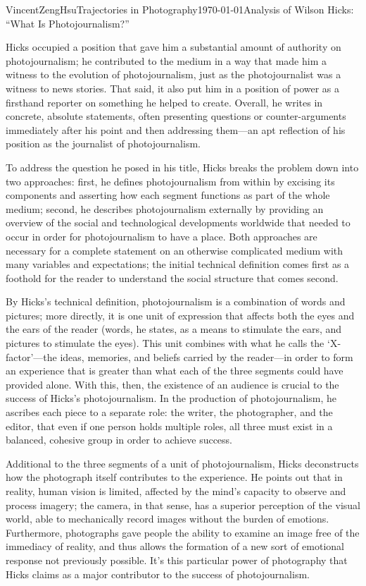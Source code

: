 \documentclass{article}[12pt]
\begin{document}
\begin{mla}{Vincent}{Zeng}{Hsu}{Trajectories in Photography}{\today}{Analysis of Wilson Hicks: ``What Is Photojournalism?''}
	
	Hicks occupied a position that gave him a substantial amount of authority on photojournalism; he contributed to the medium in a way that made him a witness to the evolution of photojournalism, just as the photojournalist was a witness to news stories. That said, it also put him in a position of power as a firsthand reporter on something he helped to create. Overall, he writes in concrete, absolute statements, often presenting questions or counter-arguments immediately after his point and then addressing them---an apt reflection of his position as the journalist of photojournalism.
	
	To address the question he posed in his title, Hicks breaks the problem down into two approaches: first, he defines photojournalism from within by excising its components and asserting how each segment functions as part of the whole medium; second, he describes photojournalism externally by providing an overview of the social and technological developments worldwide that needed to occur in order for photojournalism to have a place. Both approaches are necessary for a complete statement on an otherwise complicated medium with many variables and expectations; the initial technical definition comes first as a foothold for the reader to understand the social structure that comes second.
	
	By Hicks's technical definition, photojournalism is a combination of words and pictures; more directly, it is one unit of expression that affects both the eyes and the ears of the reader (words, he states, as a means to stimulate the ears, and pictures to stimulate the eyes). This unit combines with what he calls the `X-factor'---the ideas, memories, and beliefs carried by the reader---in order to form an experience that is greater than what each of the three segments could have provided alone. With this, then, the existence of an audience is crucial to the success of Hicks's photojournalism. In the production of photojournalism, he ascribes each piece to a separate role: the writer, the photographer, and the editor, that even if one person holds multiple roles, all three must exist in a balanced, cohesive group in order to achieve success.
	
	Additional to the three segments of a unit of photojournalism, Hicks deconstructs how the photograph itself contributes to the experience. He points out that in reality, human vision is limited, affected by the mind's capacity to observe and process imagery; the camera, in that sense, has a superior perception of the visual world, able to mechanically record images without the burden of emotions. Furthermore, photographs gave people the ability to examine an image free of the immediacy of reality, and thus allows the formation of a new sort of emotional response not previously possible. It's this particular power of photography that Hicks claims as a major contributor to the success of photojournalism.
		

\end{mla}
\end{document}
